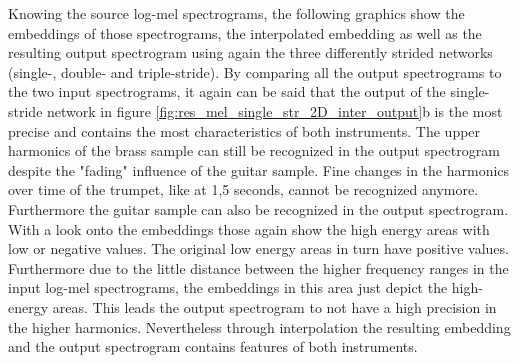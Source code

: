 Knowing the source log-mel spectrograms, the following graphics show the embeddings of those spectrograms, the interpolated embedding as well as the resulting output spectrogram using again the three differently strided networks (single-, double- and triple-stride). By comparing all the output spectrograms to the two input spectrograms, it again can be said that the output of the single-stride network in figure \ref{fig:res_mel_single_str_2D_inter_output}b is the most precise and contains the most characteristics of both instruments. The upper harmonics of the brass sample can still be recognized in the output spectrogram despite the "fading" influence of the guitar sample. Fine changes in the harmonics over time of the trumpet, like at 1,5 seconds, cannot be recognized anymore. Furthermore the guitar sample can also be recognized in the output spectrogram. With a look onto the embeddings those again show the high energy areas with low or negative values. The original low energy areas in turn have positive values. Furthermore due to the little distance between the higher frequency ranges in the input log-mel spectrograms, the embeddings in this area just depict the high-energy areas. This leads the output spectrogram to not have a high precision in the higher harmonics. Nevertheless through interpolation the resulting embedding and the output spectrogram contains features of both instruments. 

